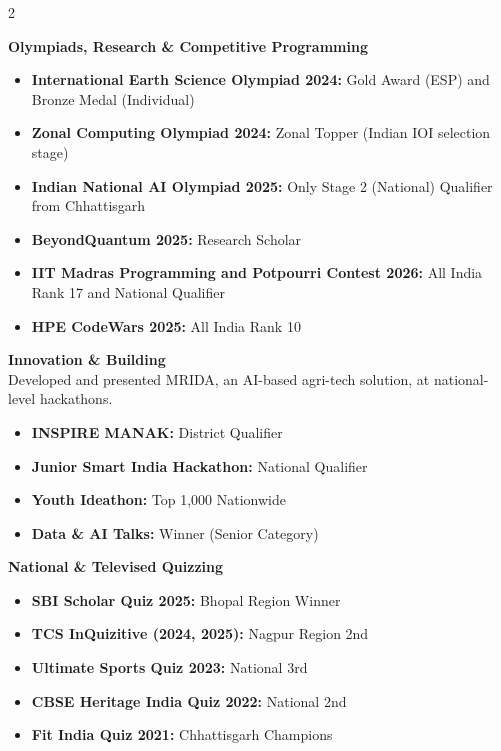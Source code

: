 \documentclass[11pt,a4paper]{article}
\begin{document}
{\small
\begin{multicols}{2}

\textbf{Olympiads, Research \& Competitive Programming}
\begin{itemize}
\item\textbf{International Earth Science Olympiad 2024:} Gold Award (ESP) and Bronze Medal (Individual)
\item\textbf{Zonal Computing Olympiad 2024:} Zonal Topper (Indian IOI selection stage)
\item\textbf{Indian National AI Olympiad 2025:} Only Stage 2 (National) Qualifier from Chhattisgarh
\item\textbf{BeyondQuantum 2025:} Research Scholar
\item\textbf{IIT Madras Programming and Potpourri Contest 2026:} All India Rank 17 and National Qualifier
\item\textbf{HPE CodeWars 2025:} All India Rank 10 
\end{itemize}

\columnbreak

\textbf{Innovation \& Building}
\\Developed and presented MRIDA, an AI-based agri-tech solution, at national-level hackathons.
\begin{itemize}
\item\textbf{INSPIRE MANAK:} District Qualifier
\item\textbf{Junior Smart India Hackathon:} National Qualifier
\item\textbf{Youth Ideathon:} Top 1,000 Nationwide
\item\textbf{Data \& AI Talks:} Winner (Senior Category)
\end{itemize}

\textbf{National \& Televised Quizzing}
\begin{itemize}
\item\textbf{SBI Scholar Quiz 2025:} Bhopal Region Winner
\item\textbf{TCS InQuizitive (2024, 2025):} Nagpur Region 2nd
\item\textbf{Ultimate Sports Quiz 2023:} National 3rd
\item\textbf{CBSE Heritage India Quiz 2022:} National 2nd
\item\textbf{Fit India Quiz 2021:} Chhattisgarh Champions
\end{itemize}

\end{multicols}
}

\vspace{3pt}
\end{document}
